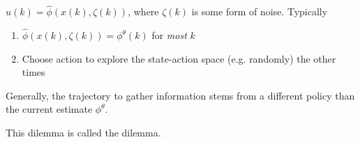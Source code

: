 \(u(k)=\hat{\phi}(x(k),\zeta(k))\), where \(\zeta(k)\) is some form of noise.
Typically 
\begin{enumerate}
    \item \(\hat{\phi}(x(k),\zeta(k))=\phi^\theta(k)\) for \textit{most} \(k\)
    \item Choose action to explore the state-action space (e.g. randomly) the other times
\end{enumerate}

Generally, the trajectory to gather information 
stems from a different policy than the current estimate \(\phi^\theta\). 

This dilemma is called the  dilemma.

